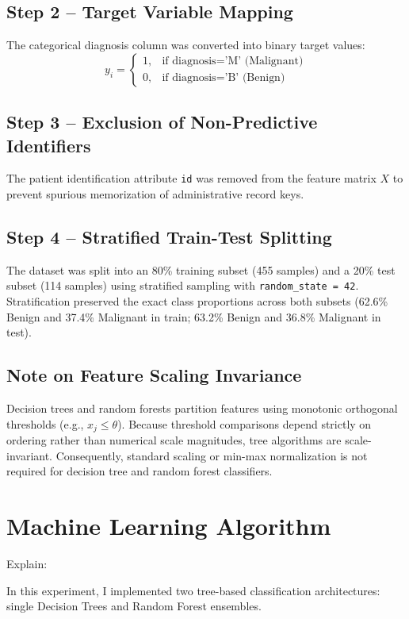 \documentclass[12pt,a4paper]{article}
\begin{document}
\subsection*{Step 2 -- Target Variable Mapping}
The categorical diagnosis column was converted into binary target values:
\begin{equation}
y_i = \begin{cases}
1, & \text{if diagnosis} = \text{'M' (Malignant)} \\
0, & \text{if diagnosis} = \text{'B' (Benign)}
\end{cases}
\end{equation}

\subsection*{Step 3 -- Exclusion of Non-Predictive Identifiers}
The patient identification attribute \texttt{id} was removed from the feature matrix $X$ to prevent spurious memorization of administrative record keys.

\subsection*{Step 4 -- Stratified Train-Test Splitting}
The dataset was split into an 80\% training subset (455 samples) and a 20\% test subset (114 samples) using stratified sampling with \texttt{random\_state = 42}. Stratification preserved the exact class proportions across both subsets (62.6\% Benign and 37.4\% Malignant in train; 63.2\% Benign and 36.8\% Malignant in test).

\subsection*{Note on Feature Scaling Invariance}
Decision trees and random forests partition features using monotonic orthogonal thresholds (e.g., $x_j \le \theta$). Because threshold comparisons depend strictly on ordering rather than numerical scale magnitudes, tree algorithms are scale-invariant. Consequently, standard scaling or min-max normalization is not required for decision tree and random forest classifiers.

\section{Machine Learning Algorithm}

Explain:

In this experiment, I implemented two tree-based classification architectures: single Decision Trees and Random Forest ensembles.
\end{document}
